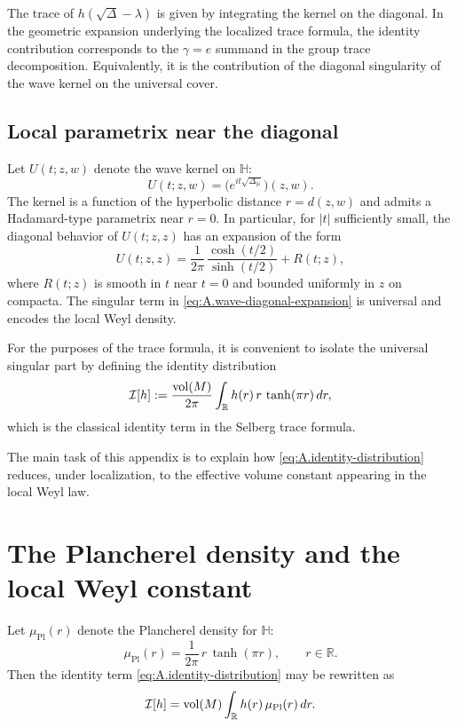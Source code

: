The trace of $h(\sqrt{\Delta}-\lambda)$ is given by integrating the kernel on the diagonal.  In the geometric
expansion underlying the localized trace formula, the identity contribution corresponds to the $\gamma = e$
summand in the group trace decomposition.  Equivalently, it is the contribution of the diagonal singularity of the
wave kernel on the universal cover.

\subsection{Local parametrix near the diagonal}
\label{subsec:A.parametrix}

Let $U(t;z,w)$ denote the wave kernel on $\mathbb{H}$:
\[
U(t;z,w) = \bigl(e^{it\sqrt{\Delta_{\mathbb{H}}}}\bigr)(z,w).
\]
The kernel is a function of the hyperbolic distance $r=d(z,w)$ and admits a Hadamard-type parametrix near $r=0$.
In particular, for $|t|$ sufficiently small, the diagonal behavior of $U(t;z,z)$ has an expansion of the form
\begin{equation}
\label{eq:A.wave-diagonal-expansion}
U(t;z,z)
=
\frac{1}{2\pi}\,\frac{\cosh(t/2)}{\sinh(t/2)}
+
R(t;z),
\end{equation}
where $R(t;z)$ is smooth in $t$ near $t=0$ and bounded uniformly in $z$ on compacta.  The singular term in
\eqref{eq:A.wave-diagonal-expansion} is universal and encodes the local Weyl density.

For the purposes of the trace formula, it is convenient to isolate the universal singular part by defining the
identity distribution
\begin{equation}
\label{eq:A.identity-distribution}
\mathcal{I}[h]
:=
\frac{\mathop{\mathrm{vol}}\nolimits(M)}{2\pi}\int_{\mathbb{R}} h(r)\,r\,\tanh(\pi r)\,dr,
\end{equation}
which is the classical identity term in the Selberg trace formula.

The main task of this appendix is to explain how \eqref{eq:A.identity-distribution} reduces, under localization, to
the effective volume constant appearing in the local Weyl law.

\section{The Plancherel density and the local Weyl constant}
\label{sec:A.plancherel}

Let $\mu_{\mathrm{Pl}}(r)$ denote the Plancherel density for $\mathbb{H}$:
\begin{equation}
\label{eq:A.plancherel-density}
\mu_{\mathrm{Pl}}(r)
=
\frac{1}{2\pi}\,r\,\tanh(\pi r),
\qquad r\in\mathbb{R}.
\end{equation}
Then the identity term \eqref{eq:A.identity-distribution} may be rewritten as
\begin{equation}
\label{eq:A.identity-plancherel}
\mathcal{I}[h]
=
\mathop{\mathrm{vol}}\nolimits(M)\int_{\mathbb{R}} h(r)\,\mu_{\mathrm{Pl}}(r)\,dr.
\end{equation}

